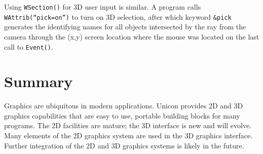 Using \texttt{WSection()} for 3D user input is similar. A program calls
\texttt{WAttrib({\textquotedblleft}pick=on{\textquotedblright})} to
turn on 3D selection, after which keyword \texttt{\&pick} generates the
identifying names for all objects intersected by the ray from the
camera through the (x,y) screen location where the mouse was located on
the last call to \texttt{Event()}.

\section*{Summary}

Graphics are ubiquitous in modern applications. Unicon provides 2D and
3D graphics capabilities that are easy to use, portable building blocks
for many programs. The 2D facilities are mature; the 3D interface is
new and will evolve. Many elements of the 2D graphics system are used
in the 3D graphics interface. Further integration of the 2D and 3D
graphics systems is likely in the future.
